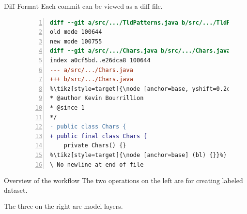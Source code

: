 \documentclass[xcolor=svgnames]{beamer}
\begin{document}
\begin{frame}[fragile]{Diff Format}
Each commit can be viewed as a diff file.


\begin{figure}
\begin{lstlisting}[language=diff, breaklines=true, numbers=left, xleftmargin=2em, escapechar=\%,]
diff --git a/src/.../TldPatterns.java b/src/.../TldPatterns.java
old mode 100644
new mode 100755
diff --git a/src/.../Chars.java b/src/.../Chars.java
index a0cf5bd..e26dca8 100644
--- a/src/.../Chars.java
+++ b/src/.../Chars.java
%\tikz[style=target]{\node [anchor=base, yshift=0.2cm] (tl) {}}%@@ -43,7 +43,7 @@ import java.util.RandomAccess; %\tikz[style=target]{\node [anchor=base, yshift=0.2cm] (tr) {}}%
* @author Kevin Bourrillion
* @since 1
*/
- public class Chars {
+ public final class Chars {
    private Chars() {}
%\tikz[style=target]{\node [anchor=base] (bl) {}}%}
\ No newline at end of file
\end{lstlisting}
\end{figure}


\end{frame}

\begin{frame}{Overview of the workflow}
The two operations on the left are for creating labeled dataset.

The three on the right are model layers.

\end{frame}
\end{document}
